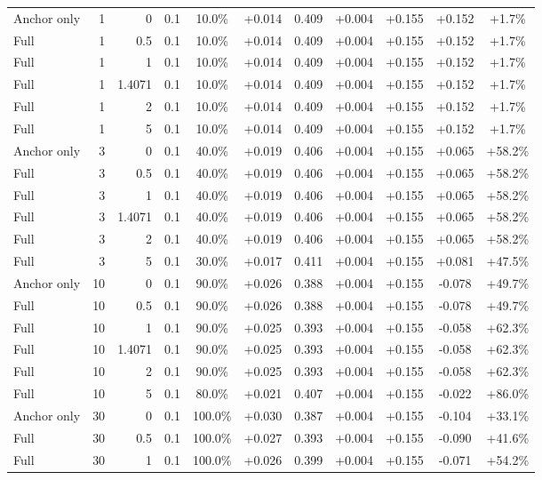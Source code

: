 \begin{table}[htbp]
\begin{tabular}{lrrrccccccc}
Anchor only & 1 & 0 & 0.1 & 10.0\% & +0.014 & 0.409 & +0.004 & +0.155 & +0.152 & +1.7\% \\
Full & 1 & 0.5 & 0.1 & 10.0\% & +0.014 & 0.409 & +0.004 & +0.155 & +0.152 & +1.7\% \\
Full & 1 & 1 & 0.1 & 10.0\% & +0.014 & 0.409 & +0.004 & +0.155 & +0.152 & +1.7\% \\
Full & 1 & 1.4071 & 0.1 & 10.0\% & +0.014 & 0.409 & +0.004 & +0.155 & +0.152 & +1.7\% \\
Full & 1 & 2 & 0.1 & 10.0\% & +0.014 & 0.409 & +0.004 & +0.155 & +0.152 & +1.7\% \\
Full & 1 & 5 & 0.1 & 10.0\% & +0.014 & 0.409 & +0.004 & +0.155 & +0.152 & +1.7\% \\
Anchor only & 3 & 0 & 0.1 & 40.0\% & +0.019 & 0.406 & +0.004 & +0.155 & +0.065 & +58.2\% \\
Full & 3 & 0.5 & 0.1 & 40.0\% & +0.019 & 0.406 & +0.004 & +0.155 & +0.065 & +58.2\% \\
Full & 3 & 1 & 0.1 & 40.0\% & +0.019 & 0.406 & +0.004 & +0.155 & +0.065 & +58.2\% \\
Full & 3 & 1.4071 & 0.1 & 40.0\% & +0.019 & 0.406 & +0.004 & +0.155 & +0.065 & +58.2\% \\
Full & 3 & 2 & 0.1 & 40.0\% & +0.019 & 0.406 & +0.004 & +0.155 & +0.065 & +58.2\% \\
Full & 3 & 5 & 0.1 & 30.0\% & +0.017 & 0.411 & +0.004 & +0.155 & +0.081 & +47.5\% \\
Anchor only & 10 & 0 & 0.1 & 90.0\% & +0.026 & 0.388 & +0.004 & +0.155 & -0.078 & +49.7\% \\
Full & 10 & 0.5 & 0.1 & 90.0\% & +0.026 & 0.388 & +0.004 & +0.155 & -0.078 & +49.7\% \\
Full & 10 & 1 & 0.1 & 90.0\% & +0.025 & 0.393 & +0.004 & +0.155 & -0.058 & +62.3\% \\
Full & 10 & 1.4071 & 0.1 & 90.0\% & +0.025 & 0.393 & +0.004 & +0.155 & -0.058 & +62.3\% \\
Full & 10 & 2 & 0.1 & 90.0\% & +0.025 & 0.393 & +0.004 & +0.155 & -0.058 & +62.3\% \\
Full & 10 & 5 & 0.1 & 80.0\% & +0.021 & 0.407 & +0.004 & +0.155 & -0.022 & +86.0\% \\
Anchor only & 30 & 0 & 0.1 & 100.0\% & +0.030 & 0.387 & +0.004 & +0.155 & -0.104 & +33.1\% \\
Full & 30 & 0.5 & 0.1 & 100.0\% & +0.027 & 0.393 & +0.004 & +0.155 & -0.090 & +41.6\% \\
Full & 30 & 1 & 0.1 & 100.0\% & +0.026 & 0.399 & +0.004 & +0.155 & -0.071 & +54.2\% \\

\end{tabular}
\end{table}
